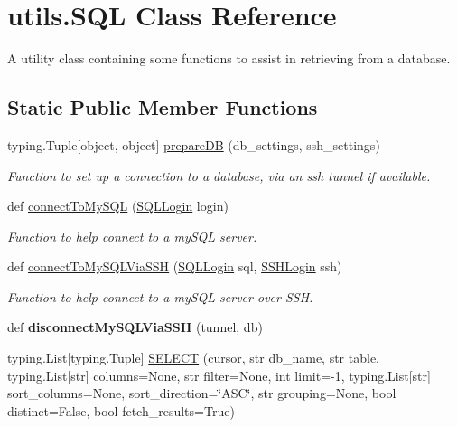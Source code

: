 \hypertarget{classutils_1_1_s_q_l}{}\section{utils.\+S\+QL Class Reference}
\label{classutils_1_1_s_q_l}


A utility class containing some functions to assist in retrieving from a database.  


\subsection*{Static Public Member Functions}
\begin{DoxyCompactItemize}
\item 
typing.\+Tuple\mbox{[}object, object\mbox{]} \mbox{\hyperlink{classutils_1_1_s_q_l_aede5d687b4b358601a48b40aeaeb338f}{prepare\+DB}} (db\+\_\+settings, ssh\+\_\+settings)
\begin{DoxyCompactList}\small\item\em Function to set up a connection to a database, via an ssh tunnel if available. \end{DoxyCompactList}\item 
def \mbox{\hyperlink{classutils_1_1_s_q_l_a4130ca2a1312987f2284f2ac1667b860}{connect\+To\+My\+S\+QL}} (\mbox{\hyperlink{classutils_1_1_s_q_l_login}{S\+Q\+L\+Login}} login)
\begin{DoxyCompactList}\small\item\em Function to help connect to a my\+S\+QL server. \end{DoxyCompactList}\item 
def \mbox{\hyperlink{classutils_1_1_s_q_l_ae60554dc510963a7dcc4bc544992f8d2}{connect\+To\+My\+S\+Q\+L\+Via\+S\+SH}} (\mbox{\hyperlink{classutils_1_1_s_q_l_login}{S\+Q\+L\+Login}} sql, \mbox{\hyperlink{classutils_1_1_s_s_h_login}{S\+S\+H\+Login}} ssh)
\begin{DoxyCompactList}\small\item\em Function to help connect to a my\+S\+QL server over S\+SH. \end{DoxyCompactList}\item 
\mbox{\label{classutils_1_1_s_q_l_aa6065ddac43d833508d7e1964c430db7}} 
def {\bfseries disconnect\+My\+S\+Q\+L\+Via\+S\+SH} (tunnel, db)
\item 
typing.\+List\mbox{[}typing.\+Tuple\mbox{]} \mbox{\hyperlink{classutils_1_1_s_q_l_a43152b5f69fea05be945a40d5c5dbf6e}{S\+E\+L\+E\+CT}} (cursor, str db\+\_\+name, str table, typing.\+List\mbox{[}str\mbox{]} columns=None, str filter=None, int limit=-\/1, typing.\+List\mbox{[}str\mbox{]} sort\+\_\+columns=None, sort\+\_\+direction=\char`\"{}A\+SC\char`\"{}, str grouping=None, bool distinct=False, bool fetch\+\_\+results=True)

\end{DoxyCompactItemize}
